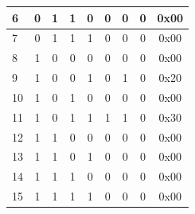 \begin{table}[]
\begin{tabular}{|l|c|c|c|c|c|c|c|c|}
6                            & 0                & 1               & 1                      & 0                & 0                & 0                & 0                & 0x00                                 \\ \hline
7                            & 0                & 1               & 1                      & 1                & 0                & 0                & 0                & 0x00                                 \\ \hline
8                            & 1                & 0               & 0                      & 0                & 0                & 0                & 0                & 0x00                                 \\ \hline
9                            & 1                & 0               & 0                      & 1                & 0                & 1                & 0                & 0x20                                 \\ \hline
10                           & 1                & 0               & 1                      & 0                & 0                & 0                & 0                & 0x00                                 \\ \hline
11                           & 1                & 0               & 1                      & 1                & 1                & 1                & 0                & 0x30                                 \\ \hline
12                           & 1                & 1               & 0                      & 0                & 0                & 0                & 0                & 0x00                                 \\ \hline
13                           & 1                & 1               & 0                      & 1                & 0                & 0                & 0                & 0x00                                 \\ \hline
14                           & 1                & 1               & 1                      & 0                & 0                & 0                & 0                & 0x00                                 \\ \hline
15                           & 1                & 1               & 1                      & 1                & 0                & 0                & 0                & 0x00                                 \\ \hline
\end{tabular}
\end{table}

